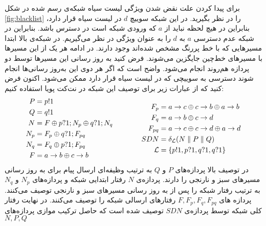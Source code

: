 برای پیدا کردن علت نقض شدن ویژگی لیست سیاه شبکه‌ی رسم شده در شکل
\ref{fig:blacklist}
را در نظر بگیرید.
در این شبکه سوییچ
$d$
در لیست‌ سیاه قرار دارد، بنابراین در هیچ لحظه نباید از
$a$
که ورودی شبکه است در دسترس باشد.
بنابراین در شبکه عدم دسترسی 
$a$
به 
$d$
را به عنوان ویژگی در نظر می‌گیریم.
در شبکه‌ی بالا ابتدا مسیر‌هایی که با خط پررنگ مشخص شده‌اند وجود دارند.
در ادامه هر یک از این مسیرها با مسیر‌های خط‌چین جایگزین می‌شوند.
فرض کنید به روز رسانی این مسیر‌ها توسط دو پردازه هم‌روند انجام می‌شود.
واضح است که اگر هر دوی این به‌روز رسانی‌ها انجام شوند دسترسی به سوییچی که در لیست سیاه قرار دارد ممکن می‌شود.
اکنون فرض کنید که از عبارات زیر برای توصیف این شبکه در نت‌کت پویا استفاده کنیم:
\begin{equation*}
    \begin{aligned}[c]
        P   & = p!1                             \\
        Q   & = q!1                             \\
        N   & = F \oplus p?1;N_p \oplus q?1;N_q \\
        N_p & = F_p \oplus q?1;F_{pq}           \\
        N_q & = F_q \oplus p?1;F_{pq}           \\
        F   & = a\rightarrow b \oplus c\rightarrow b            \\
    \end{aligned}
    \qquad\qquad
    \begin{aligned}[c]
        F_p         & = a\rightarrow c \oplus c\rightarrow b \oplus a\rightarrow b \\
        F_q         & = a\rightarrow b \oplus c\rightarrow d               \\
        F_{pq}      & = a\rightarrow c \oplus c\rightarrow d \oplus a\rightarrow d \\
        SDN         & = \delta_{\mathcal{L}} (N
        \parallel P \parallel Q)                           \\
        \mathcal{L} & = \{p!1,p?1,q?1,q?1\}                \\
    \end{aligned}
\end{equation*}
در توصیف بالا پردازه‌های
$P$
و
$Q$
به ترتیب وظیفه‌ای ارسال پیام برای به روز رسانی مسیر‌های سبز و نارنجی را دارند.
پردازه‌ی
$N$
رفتار ابتدایی شبکه و پردازه‌های
$N_p$
و
$N_q$
به ترتیب رفتار شبکه را پس از به روز رسانی مسیر‌های سبز و نارنجی توصیف می‌کنند.
پردازه‌ های
$F,F_p,F_q,F_{pq}$
رفتارهای ارسالی%
شبکه را توصیف می‌کنند.
در نهایت رفتار کلی شبکه توسط پردازه‌ی
$SDN$
توصیف شده است که حاصل ترکیب موازی پردازه‌های
$N,P,Q$
